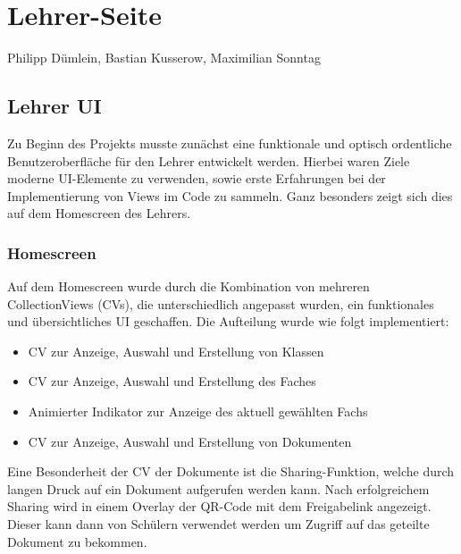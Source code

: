 \chapter{Lehrer-Seite}
Philipp Dümlein, Bastian Kusserow, Maximilian Sonntag


\section{Lehrer UI}
Zu Beginn des Projekts musste zunächst eine funktionale und optisch ordentliche Benutzeroberfläche für den Lehrer entwickelt werden. Hierbei waren Ziele moderne UI-Elemente zu verwenden, sowie erste Erfahrungen bei der Implementierung von Views im Code zu sammeln. Ganz besonders zeigt sich dies auf dem Homescreen des Lehrers.
\subsection{Homescreen}
Auf dem Homescreen wurde durch die Kombination von mehreren CollectionViews (CVs), die unterschiedlich angepasst wurden, ein funktionales und übersichtliches UI geschaffen. Die Aufteilung wurde wie folgt implementiert:
\begin{itemize}
\item CV zur Anzeige, Auswahl und Erstellung von Klassen
\item CV zur Anzeige, Auswahl und Erstellung des Faches    
\item Animierter Indikator zur Anzeige des aktuell gewählten Fachs
\item CV zur Anzeige, Auswahl und Erstellung von Dokumenten
\end{itemize}
Eine Besonderheit der CV der Dokumente ist die Sharing-Funktion, welche durch langen Druck auf ein Dokument aufgerufen werden kann. Nach erfolgreichem Sharing wird in einem Overlay der QR-Code mit dem Freigabelink angezeigt. Dieser kann dann von Schülern verwendet werden um Zugriff auf das geteilte Dokument zu bekommen.

